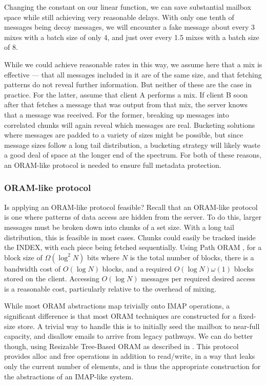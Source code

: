 \documentclass[pageno]{jpaper}
\begin{document}
Changing the constant on our linear function, we can save substantial mailbox space while still achieving very reasonable delays. With only one tenth of messages being decoy messages, we will encounter a fake message about every 3 mixes with a batch size of only 4, and just over every 1.5 mixes with a batch size of 8.

While we could achieve reasonable rates in this way, we assume here that a mix is effective \---- that all messages included in it are of the same size, and that fetching patterns do not reveal further information. But neither of these are the case in practice. For the latter, assume that client A performs a mix. If client B soon after that fetches a message that was output from that mix, the server knows that a message was received. For the former, breaking up messages into correlated chunks will again reveal which messages are real. Bucketing solutions where messages are padded to a variety of sizes might be possible, but since message sizes follow a long tail distribution, a bucketing strategy will likely waste a good deal of space at the longer end of the spectrum. For both of these reasons, an ORAM-like protocol is needed to ensure full metadata protection.


\subsubsection{ORAM-like protocol}

Is applying an ORAM-like protocol feasible? Recall that an ORAM-like protocol is one where patterns of data access are hidden from the server. To do this, larger messages must be broken down into chunks of a set size. With a long tail distribution, this is feasible in most cases. Chunks could easily be tracked inside the INDEX, with each piece being fetched sequentially. Using Path ORAM \cite{stefanov2013path}, for a block size of $\Omega (\log ^2 N)$ bits where $N$ is the total number of blocks, there is a bandwidth cost of $O(\log N)$ blocks, and a required $O(\log N)\omega(1)$ blocks stored on the client. Accessing $O(\log N)$ messages per required desired access is a reasonable cost, particularly relative to the overhead of mixing.

While most ORAM abstractions map trivially onto IMAP operations, a significant difference is that most ORAM techniques are constructed for a fixed-size store. A trivial way to handle this is to initially seed the mailbox to near-full capacity, and disallow emails to arrive from legacy pathways. We can do better though, using Resizable Tree-Based ORAM as described in \cite{moatazresizable}. This protocol provides alloc and free operations in addition to read/write, in a way that leaks only the current number of elements, and is thus the appropriate construction for the abstractions of an IMAP-like system.
\end{document}
